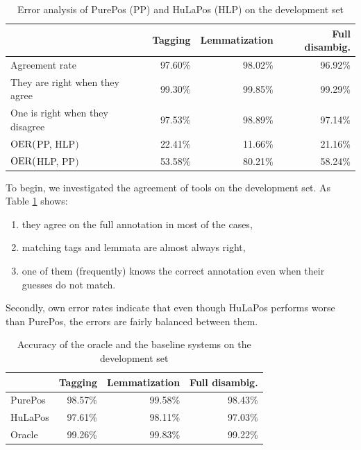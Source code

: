 \begin{table}[H]
\centering
\caption{Error analysis of PurePos (PP) and HuLaPos (HLP) on the development set}\label{tab:comb-disambig-comp}
\begin{tabular}{l r r r}
\hline
& Tagging & Lemmatization & Full disambig. \\
\hline
Agreement rate & 97.60\% & 98.02\% & 96.92\% \\
They are right when they agree & 99.30\% & 99.85\% & 99.29\% \\
One is right when they disagree & 97.53\% & 98.89\% & 97.14\% \\
$\operatorname{OER}($PP, HLP$)$ & 22.41\% & 11.66\% & 21.16\% \\
$\operatorname{OER}($HLP, PP$)$ & 53.58\% & 80.21\% & 58.24\% \\
\hline
\end{tabular}
\end{table}

To begin, we investigated the agreement of tools on the development set.
As Table \ref{tab:comb-disambig-comp} shows:
\begin{enumerate}
 \item they agree on the full annotation in most of the cases,
 \item matching tags and lemmata are almost always right, 
 \item one of them (frequently) knows the correct annotation even when their guesses do not match.
\end{enumerate}

Secondly, own error rates indicate that even though HuLaPos performs worse than PurePos, the errors are fairly balanced between them. 

\begin{table}[H]
\centering
\caption{Accuracy of the oracle and the baseline systems on the development set}\label{tab:comb-disambig-acc}
\begin{tabular}{l r r r}
\hline
& Tagging & Lemmatization & Full disambig. \\
\hline
PurePos & 98.57\% & 99.58\% & 98.43\% \\
HuLaPos & 97.61\% & 98.11\% & 97.03\% \\
Oracle & 99.26\% & 99.83\% & 99.22\% \\
\hline
\end{tabular}
\end{table}

